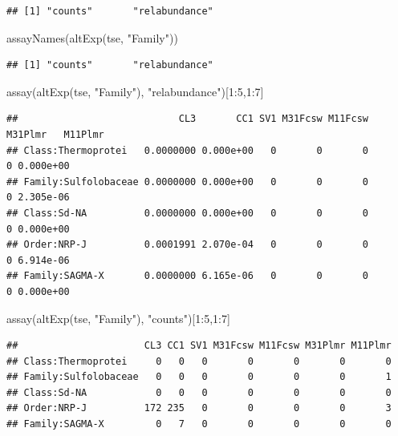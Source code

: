 \documentclass[
]{book}
\newenvironment{Shaded}{\begin{snugshade}}{\end{snugshade}}
\newcommand{\DecValTok}[1]{\textcolor[rgb]{0.00,0.00,0.81}{#1}}
\newcommand{\FunctionTok}[1]{\textcolor[rgb]{0.00,0.00,0.00}{#1}}
\newcommand{\NormalTok}[1]{#1}
\newcommand{\SpecialCharTok}[1]{\textcolor[rgb]{0.00,0.00,0.00}{#1}}
\newcommand{\StringTok}[1]{\textcolor[rgb]{0.31,0.60,0.02}{#1}}
\begin{document}
\begin{verbatim}
## [1] "counts"       "relabundance"
\end{verbatim}

\begin{Shaded}
\begin{Highlighting}[]
\FunctionTok{assayNames}\NormalTok{(}\FunctionTok{altExp}\NormalTok{(tse, }\StringTok{"Family"}\NormalTok{))}
\end{Highlighting}
\end{Shaded}

\begin{verbatim}
## [1] "counts"       "relabundance"
\end{verbatim}

\begin{Shaded}
\begin{Highlighting}[]
\FunctionTok{assay}\NormalTok{(}\FunctionTok{altExp}\NormalTok{(tse, }\StringTok{"Family"}\NormalTok{), }\StringTok{"relabundance"}\NormalTok{)[}\DecValTok{1}\SpecialCharTok{:}\DecValTok{5}\NormalTok{,}\DecValTok{1}\SpecialCharTok{:}\DecValTok{7}\NormalTok{]}
\end{Highlighting}
\end{Shaded}

\begin{verbatim}
##                            CL3       CC1 SV1 M31Fcsw M11Fcsw M31Plmr   M11Plmr
## Class:Thermoprotei   0.0000000 0.000e+00   0       0       0       0 0.000e+00
## Family:Sulfolobaceae 0.0000000 0.000e+00   0       0       0       0 2.305e-06
## Class:Sd-NA          0.0000000 0.000e+00   0       0       0       0 0.000e+00
## Order:NRP-J          0.0001991 2.070e-04   0       0       0       0 6.914e-06
## Family:SAGMA-X       0.0000000 6.165e-06   0       0       0       0 0.000e+00
\end{verbatim}

\begin{Shaded}
\begin{Highlighting}[]
\FunctionTok{assay}\NormalTok{(}\FunctionTok{altExp}\NormalTok{(tse, }\StringTok{"Family"}\NormalTok{), }\StringTok{"counts"}\NormalTok{)[}\DecValTok{1}\SpecialCharTok{:}\DecValTok{5}\NormalTok{,}\DecValTok{1}\SpecialCharTok{:}\DecValTok{7}\NormalTok{]}
\end{Highlighting}
\end{Shaded}

\begin{verbatim}
##                      CL3 CC1 SV1 M31Fcsw M11Fcsw M31Plmr M11Plmr
## Class:Thermoprotei     0   0   0       0       0       0       0
## Family:Sulfolobaceae   0   0   0       0       0       0       1
## Class:Sd-NA            0   0   0       0       0       0       0
## Order:NRP-J          172 235   0       0       0       0       3
## Family:SAGMA-X         0   7   0       0       0       0       0
\end{verbatim}
\end{document}

